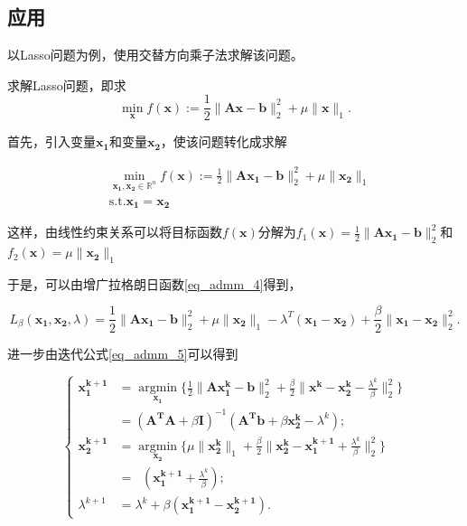 \subsection{应用}

以Lasso问题为例，使用交替方向乘子法求解该问题。

\begin{problem}
    求解Lasso问题，即求
    \begin{equation}
        \mathop{\mathrm{min}}\limits_{\bm{x}} f(\bm{x}) := \frac{1}{2}\|\bm{A} \bm{x}-\bm{b}\|_{2}^{2} + \mu\|\bm{x}\|_{1}.
    \end{equation}
\end{problem}

\begin{solution}
    首先，引入变量$\bm{x_{1}}$和变量$\bm{x_{2}}$，使该问题转化成求解

    \begin{equation}
        \begin{split}
            &\mathop{\mathrm{min}}\limits_{\bm{x_{1}, x_{2}}\in \mathbb{R}^{n}} f(\bm{x}) := \frac{1}{2}\|\bm{A} \bm{x_{1}}-\bm{b}\|_{2}^{2} + \mu\|\bm{x_{2}}\|_{1} \\
            &\mathrm{s. t.} \bm{x_{1}} = \bm{x_{2}}
        \end{split}
    \end{equation}

    这样，由线性约束关系可以将目标函数$f(\bm{x})$分解为$f_{1}(\bm{x}) = \frac{1}{2}\|\bm{A} \bm{x_{1}}-\bm{b}\|_{2}^{2}$和$f_{2}(\bm{x}) = \mu\|\bm{x_{2}}\|_{1}$

    于是，可以由增广拉格朗日函数\ref{eq_admm_4}得到，

    \begin{equation*}
        L_{\beta}(\bm{x_{1}}, \bm{x_{2}}, \lambda) = \frac{1}{2} \|\bm{Ax_{1}-b}\|_{2}^{2} + \mu \|\bm{x_{2}}\|_{1} - \lambda^{T}(\bm{x_{1}-x_{2}}) + \frac{\beta}{2} \|\bm{x_{1}-x_{2}}\|_{2}^{2}.
    \end{equation*}

    进一步由迭代公式\ref{eq_admm_5}可以得到

    \begin{equation}
        \begin{cases}
            \bm{x_{1}^{k+1}} &= \mathop{\mathrm{argmin}}\limits_{\bm{x_{1}}} \{ \frac{1}{2}\|\bm{Ax_{1}^{k}}-\bm{b}\|_{2}^{2} + \frac{\beta}{2}\|\bm{x^{k}} - \bm{x_{2}^{k}} -\frac{\lambda^{k}}{\beta}\|_{2}^{2} \} \\
                             &= (\bm{A^{T}A}+\beta\bm{I})^{-1}(\bm{A^{T}b} + \beta\bm{x_{2}^{k}} - \lambda^{k}) ; \\
            \bm{x_{2}^{k+1}} &= \mathop{\mathrm{argmin}}\limits_{\bm{x_{2}}} \{ \mu\|\bm{x_{2}^{k}}\|_{1} + \frac{\beta}{2} \|\bm{x_{2}^{k}}-\bm{x_{1}^{k+1}}+\frac{\lambda^{k}}{\beta}\|_{2}^{2}\} \\
                             &= \mathop{\mathrm{prox_{\frac{\mu}{\beta}\|\cdot\|_{1}}}}(\bm{x_{1}^{k+1}} + \frac{\lambda^{k}}{\beta}) ; \\
            \lambda^{k+1} &= \lambda^{k} + \beta(\bm{x_{1}^{k+1}-\bm{x_{2}^{k+1}}}).
        \end{cases}
    \end{equation}


\end{solution}
